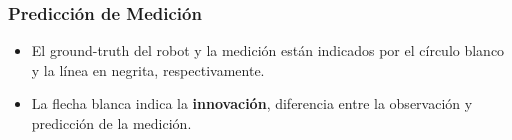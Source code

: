 \begin{frame}
    \frametitle{Predicción de Medición}
    
    \begin{figure}[!h]
        \centering
    \end{figure}
    \footnotesize
    \begin{itemize}
        \item El ground-truth del robot y la medición están indicados por el círculo blanco y la línea en negrita, respectivamente.

        \item La flecha blanca indica la \textbf{innovación}, diferencia entre la observación y predicción de la medición.
    \end{itemize}

    
    
\end{frame}


